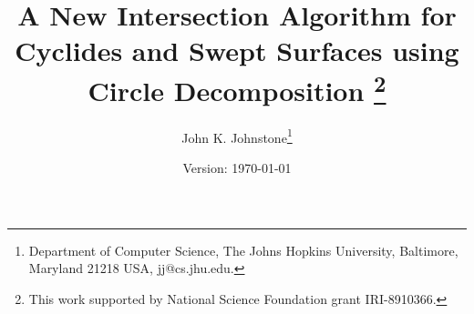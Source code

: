 \newtheorem{rmk}{Remark}[section]
\newtheorem{example}{Example}[section]
\newtheorem{conjecture}{Conjecture}[section]
\newtheorem{claim}{Claim}[section]
\newtheorem{notation}{Notation}[section]
\newtheorem{lemma}{Lemma}[section]
\newtheorem{theorem}{Theorem}[section]
\newtheorem{corollary}{Corollary}[section]
\newtheorem{defn2}{Definition}

\ifFull
\SingleSpace
\else
\DoubleSpace
\fi

\setlength{\oddsidemargin}{0pt}
\setlength{\evensidemargin}{0pt}
\setlength{\headsep}{0pt}
\setlength{\topmargin}{0pt}
\setlength{\textheight}{8.75in}
\setlength{\textwidth}{6.5in}



\setlength{\headsep}{.2in}
\setclock

	
\title{A New Intersection Algorithm for Cyclides and Swept Surfaces
	using Circle Decomposition
	\thanks{This work supported by National Science Foundation grant
	IRI-8910366.}}
\author{John K. Johnstone\thanks{Department of Computer Science,
	The Johns Hopkins University,
	Baltimore, Maryland 21218 USA,
	jj@cs.jhu.edu.}}
\date{Version: \today \clock}




\maketitle


% 

